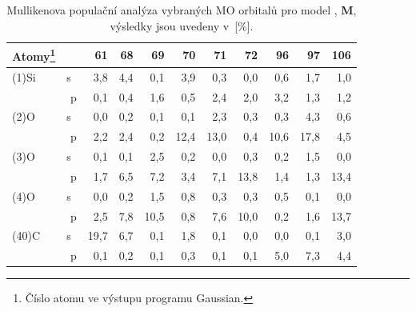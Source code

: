 \documentclass[
digital, %
table,   %
nolof,     %
nolot,     %
oneside,
]{fithesis3}
\begin{document}
\begin{table}[H]\begin{minipage}{\textwidth}
\caption{Mullikenova populační analýza vybraných MO orbitalů pro model , \textbf{M}, výsledky jsou uvedeny v~[\%].}
\begin{center}
\begin{tabular}{|l|r|r|r|r|r|r|r|r|r|r|}
\hline
Atomy\footnote{Číslo atomu ve výstupu programu Gaussian.}   \label{si_model_methyl_MPA_I}  &  & 61 & 68 & 69 & 70 & 71 & 72 & 96 & 97 & 106 \\ \hline
(1)Si  & s~& 3,8  & 4,4 &  0,1  & 3,9  & 0,3  & 0,0  & 0,6  & 1,7  & 1,0  \\ \hline
& p & 0,1  & 0,4& 1,6  & 0,5  & 2,4  & 2,0  & 3,2  & 1,3  & 1,2  \\ \hline
(2)O & s~& 0,0  & 0,2& 0,1  & 0,1  & 2,3  & 0,3  & 0,3  & 4,3  & 0,6  \\ \hline
& p & 2,2  & 2,4& 0,2  & 12,4  & 13,0  & 0,4  & 10,6  & 17,8  & 4,5  \\ \hline
(3)O & s~& 0,1  & 0,1& 2,5  & 0,2  & 0,0  & 0,3  & 0,2  & 1,5  & 0,0  \\ \hline
& p & 1,7  & 6,5 &7,2  & 3,4  & 7,1  & 13,8  & 1,4  & 1,3  & 13,4  \\ \hline
(4)O & s~& 0,0  & 0,2& 1,5  & 0,8  & 0,3  & 0,3  & 0,5  & 0,1  & 0,0  \\ \hline
& p & 2,5  & 7,8& 10,5  & 0,8  & 7,6  & 10,0  & 0,2  & 1,6  & 13,7  \\ \hline
(40)C & s~& 19,7  & 6,7& 0,1  & 1,8  & 0,1  & 0,0  & 0,0  & 0,1  & 3,0  \\ \hline
& p & 0,1  & 0,2& 0,1  & 0,3  & 0,1  & 0,1  & 5,0  & 7,3  & 4,4  \\ \hline
\end{tabular}
\end{center}\end{minipage}\end{table}
\end{document}
